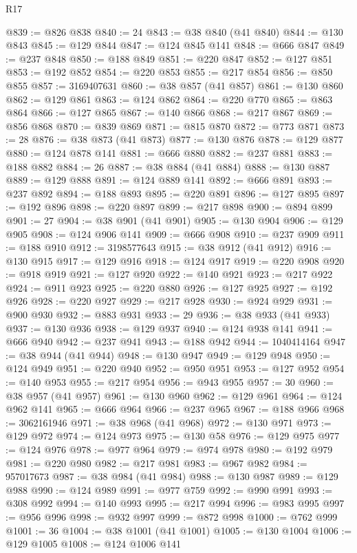 \begin{lexlean}{R17}
\begin{coremodule}
@839 := @826 @838
@840 := 24
@843 := @38 @840 (@41 @840)
@844 := @130 @843
@845 := @129 @844
@847 := @124 @845 @141
@848 := @666 @847
@849 := @237 @848
@850 := @188 @849
@851 := @220 @847
@852 := @127 @851
@853 := @192 @852
@854 := @220 @853
@855 := @217 @854
@856 := @850 @855
@857 := 3169407631
@860 := @38 @857 (@41 @857)
@861 := @130 @860
@862 := @129 @861
@863 := @124 @862
@864 := @220 @770
@865 := @863 @864
@866 := @127 @865
@867 := @140 @866
@868 := @217 @867
@869 := @856 @868
@870 := @839 @869
@871 := @815 @870
@872 := @773 @871
@873 := 28
@876 := @38 @873 (@41 @873)
@877 := @130 @876
@878 := @129 @877
@880 := @124 @878 @141
@881 := @666 @880
@882 := @237 @881
@883 := @188 @882
@884 := 26
@887 := @38 @884 (@41 @884)
@888 := @130 @887
@889 := @129 @888
@891 := @124 @889 @141
@892 := @666 @891
@893 := @237 @892
@894 := @188 @893
@895 := @220 @891
@896 := @127 @895
@897 := @192 @896
@898 := @220 @897
@899 := @217 @898
@900 := @894 @899
@901 := 27
@904 := @38 @901 (@41 @901)
@905 := @130 @904
@906 := @129 @905
@908 := @124 @906 @141
@909 := @666 @908
@910 := @237 @909
@911 := @188 @910
@912 := 3198577643
@915 := @38 @912 (@41 @912)
@916 := @130 @915
@917 := @129 @916
@918 := @124 @917
@919 := @220 @908
@920 := @918 @919
@921 := @127 @920
@922 := @140 @921
@923 := @217 @922
@924 := @911 @923
@925 := @220 @880
@926 := @127 @925
@927 := @192 @926
@928 := @220 @927
@929 := @217 @928
@930 := @924 @929
@931 := @900 @930
@932 := @883 @931
@933 := 29
@936 := @38 @933 (@41 @933)
@937 := @130 @936
@938 := @129 @937
@940 := @124 @938 @141
@941 := @666 @940
@942 := @237 @941
@943 := @188 @942
@944 := 1040414164
@947 := @38 @944 (@41 @944)
@948 := @130 @947
@949 := @129 @948
@950 := @124 @949
@951 := @220 @940
@952 := @950 @951
@953 := @127 @952
@954 := @140 @953
@955 := @217 @954
@956 := @943 @955
@957 := 30
@960 := @38 @957 (@41 @957)
@961 := @130 @960
@962 := @129 @961
@964 := @124 @962 @141
@965 := @666 @964
@966 := @237 @965
@967 := @188 @966
@968 := 3062161946
@971 := @38 @968 (@41 @968)
@972 := @130 @971
@973 := @129 @972
@974 := @124 @973
@975 := @130 @58
@976 := @129 @975
@977 := @124 @976
@978 := @977 @964
@979 := @974 @978
@980 := @192 @979
@981 := @220 @980
@982 := @217 @981
@983 := @967 @982
@984 := 957017673
@987 := @38 @984 (@41 @984)
@988 := @130 @987
@989 := @129 @988
@990 := @124 @989
@991 := @977 @759
@992 := @990 @991
@993 := @308 @992
@994 := @140 @993
@995 := @217 @994
@996 := @983 @995
@997 := @956 @996
@998 := @932 @997
@999 := @872 @998
@1000 := @762 @999
@1001 := 36
@1004 := @38 @1001 (@41 @1001)
@1005 := @130 @1004
@1006 := @129 @1005
@1008 := @124 @1006 @141

\end{coremodule}
\end{lexlean}
